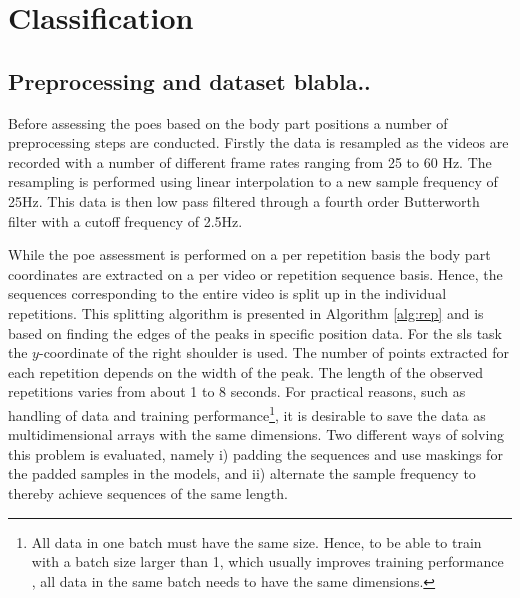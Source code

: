 \section{Classification} \label{sec:met-class}

\subsection{Preprocessing and dataset blabla..} \label{sec:met-class-preproc}
Before assessing the \glspl{poe} based on the body part positions a number of preprocessing steps are conducted. Firstly the data is resampled as the videos are recorded with a number of different frame rates ranging from 25 to 60 Hz. The resampling is performed using linear interpolation to a new sample frequency of 25Hz. This data is then low pass filtered through a fourth order Butterworth filter with a cutoff frequency of 2.5Hz. %

While the \gls{poe} assessment is performed on a per repetition basis the body part coordinates are extracted on a per video or repetition sequence basis. Hence, the sequences corresponding to the entire video is split up in the individual repetitions. This splitting algorithm is presented in Algorithm \ref{alg:rep} and is based on finding the edges of the peaks in specific position data. For the \gls{sls} task the $y$-coordinate of the right shoulder is used. The number of points extracted for each repetition depends on the width of the peak. The length of the observed repetitions varies from about 1 to 8 seconds. For practical reasons, such as handling of data and training performance\footnote{All data in one batch must have the same size. Hence, to be able to train with a batch size larger than 1, which usually improves training performance \cite{Goodfellow2016}, all data in the same batch needs to have the same dimensions.}, it is desirable to save the data as multidimensional arrays with the same dimensions. Two different ways of solving this problem is evaluated, namely i) padding the sequences and use maskings for the padded samples in the models, and ii) alternate the sample frequency to thereby achieve sequences of the same length.

